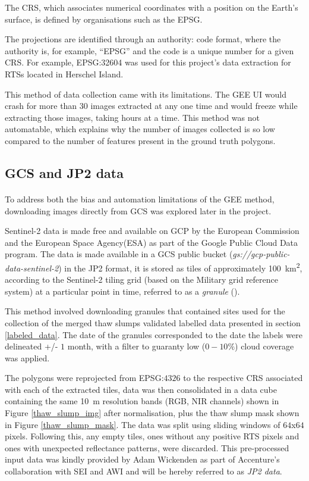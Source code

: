 The \gls{CRS}, which associates numerical coordinates with a position on the Earth's surface, is defined by organisations such as the \gls{EPSG}.

The projections are identified through an authority: code format, where the authority is, for example, “\gls{EPSG}” and the code is a unique number for a given \gls{CRS}. For example, \gls{EPSG}:32604 was used for this project's data extraction for \gls{RTS}s located in Herschel Island.

This method of data collection came with its limitations. The \gls{GEE} \gls{UI} would crash for more than 30 images extracted at any one time and would freeze while extracting those images, taking hours at a time. This method was not automatable, which explains why the number of images collected is so low compared to the number of features present in the ground truth polygons.

\subsection{\gls{GCS} and \gls{JP2} data}
\paragraph{}
To address both the bias and automation limitations of the \gls{GEE} method, downloading images directly from \gls{GCS} was explored later in the project.

Sentinel-2 data is made free and available on \gls{GCP} by the European Commission and the European Space Agency(ESA) as part of the Google Public Cloud Data program. The data is made available in a \gls{GCS} public bucket (\textit{gs://gcp-public-data-sentinel-2}) in the \gls{JP2} format, it is stored as tiles of approximately \SI{100}{\kilo\metre\squared}, according to the Sentinel-2 tiling grid (based on the Military grid reference system) at a particular point in time, referred to as a \textit{granule} (\cite{sentinel2_gcp}).

This method involved downloading granules that contained sites used for the collection of the merged thaw slumps validated labelled data presented in section \ref{labeled_data}. The date of the granules corresponded to the date the labels were delineated +/- $1$ month, with a filter to guaranty low ($0-10\%$) cloud coverage was applied.

The polygons were reprojected from \gls{EPSG}:$4326$ to the respective \gls{CRS} associated with each of the extracted tiles, data was then consolidated in a data cube containing the same \SI{10}{\metre} resolution bands (\gls{RGB}, \gls{NIR} channels) shown in Figure \ref{thaw_slump_img} after normalisation, plus the thaw slump mask shown in Figure \ref{thaw_slump_mask}. The data was split using sliding windows of $64$x$64$ pixels. Following this, any empty tiles, ones without any positive \gls{RTS} pixels and ones with unexpected reflectance patterns, were discarded. This pre-processed input data was kindly provided by Adam Wickenden as part of Accenture's collaboration with \gls{SEI} and \gls{AWI} and will be hereby referred to as \textit{\gls{JP2} data}.

